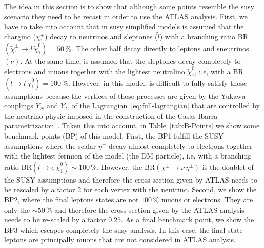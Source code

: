 \documentclass[12pt,letterpaper]{article}
\begin{document}
The idea in this section is to show that although some points resemble the susy scenario they need to be recast in order to use the ATLAS analysis. 
%
First, we have to take into account that in susy simplified models is assumed that the chargino ($\chi_1^{\pm}$) decay to neutrinos and sleptones ($\tilde{l}$) with a branching ratio BR$(\tilde{\chi}_1^{\pm}\to l\,\tilde{\chi}_1^0)=50\,\%$. The other half decay directly to leptons and sneutrinos $(\tilde{\nu})$.
%
At the same time, is assumed that the sleptones decay completely to electrons and muons together with the lightest neutralino $\tilde{\chi}_1^0$, i.e, with a BR$(\tilde{l}\to l\,\tilde{\chi}_1^0)=100\,\%$.
%
However, in this model, is difficult to fully satisfy those assumptions because the vertices of those processes are given by the Yukawa couplings $Y_N$ and $Y_{\Sigma}$ of the Lagrangian~\ref{eq:full-lagrangian} that are controlled by the neutrino physic imposed in the construction of the Casas-Ibarra parametrization~\cite{Casas:2001sr, Ibarra:2003up}.
%
Taken this into account, in Table~\ref{tab:B-Points} we show some benchmark points (BP) of this model.
% 
First, the BP1 fulfill the SUSY assumptions where the scalar $\eta^{\pm}$ decay almost completely to electrons together with the lightest fermion of the model (the DM particle), i.e, with a branching ratio BR$(\tilde{l}\to e\,\tilde{\chi}_1^0)\sim 100\,\%$. 
However, the $\text{BR}(\chi^{\pm}\to \nu\, \eta^{\pm})$ is the doublet of the SUSY assumptions and therefore the cross-section given by ATLAS needs to be rescaled by a factor 2 for each vertex with the neutrino.
%  
Second, we show the BP2, where the final leptons states are not $100\,\%$ muons or electrons. They are only the $\sim50\,\%$ and therefore the cross-section given by the ATLAS analysis needs to be re-scaled by a factor 
$0.25$.
%
As a final benchmark point, we show the BP3 which escapes completely the susy analysis. In this case, the final state leptons are principally muons that are not considered in ATLAS analysis.
%
\end{document}
